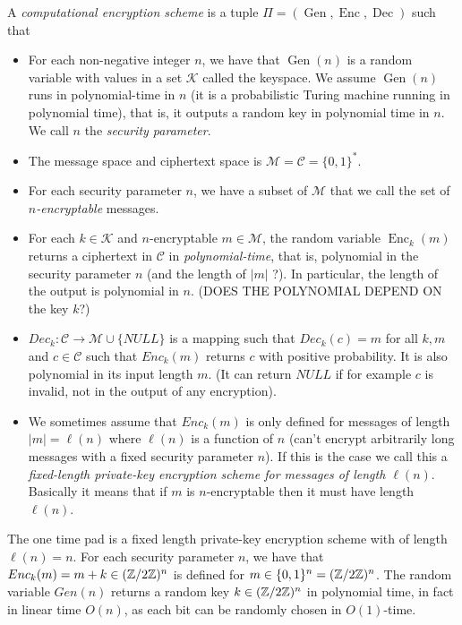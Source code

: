 \documentclass[twoside, a4paper, 10pt]{amsart}
\begin{document}
\begin{mydef} A \textit{computational encryption scheme} is a tuple $\Pi = (\operatorname{Gen}, \operatorname{Enc}, \operatorname{Dec})$ such that

\begin{itemize}
	\item For each non-negative integer $n$, we have that $\operatorname{Gen}(n)$ is a random variable with values in a set $\mathcal{K}$ called the keyspace. We assume $\operatorname{Gen}(n)$ runs in polynomial-time in $n$ (it is a probabilistic Turing machine running in polynomial time), that is, it outputs a random key in polynomial time in $n$. We call $n$ the \textit{security parameter}.
	\item The message space and ciphertext space is $\mathcal{M} = \mathcal{C} = \{0,1\}^*$.
	\item For each security parameter $n$, we have a subset of $\mathcal{M}$ that we call the set of \textit{$n$-encryptable} messages.
	\item For each $k \in \mathcal{K}$ and $n$-encryptable $m \in \mathcal{M}$, the random variable $\operatorname{Enc}_k(m)$ returns a ciphertext in $\mathcal{C}$ in \textit{polynomial-time}, that is, polynomial in the security parameter $n$ (and the length of $|m|$ ?). In particular, the length of the output is polynomial in $n$. (DOES THE POLYNOMIAL DEPEND ON the key $k$?)
	\item $Dec_k:\mathcal{C} \to \mathcal{M} \cup \{ NULL \}$ is a mapping such that $Dec_k(c) = m$ for all $k, m$ and $c \in \mathcal{C}$ such that $Enc_k(m)$ returns $c$ with positive probability. It is also polynomial in its input length $m$. (It can return $NULL$ if for example $c$ is invalid, not in the output of any encryption).
	\item We sometimes assume that $Enc_k(m)$ is only defined for messages of length $|m| = \ell(n)$ where $\ell(n)$ is a function of $n$ (can't encrypt arbitrarily long messages with a fixed security parameter $n$). If this is the case we call this a \textit{fixed-length private-key encryption scheme for messages of length $\ell(n)$}. Basically it means that if $m$ is $n$-encryptable then it must have length $\ell(n)$.
\end{itemize}

\end{mydef}

\begin{eg} The one time pad is a fixed length private-key encryption scheme with of length $\ell(n)=n$. For each security parameter $n$, we have that $Enc_k(m) = m+k \in (\mathbb{Z}/2\mathbb{Z})^n$ is defined for $m \in \{0,1\}^n = (\mathbb{Z}/2\mathbb{Z})^n$. The random variable $Gen(n)$ returns a random key $k \in (\mathbb{Z}/2\mathbb{Z})^n$ in polynomial time, in fact in linear time $O(n)$, as each bit can be randomly chosen in $O(1)$-time.

\end{eg}
\end{document}
